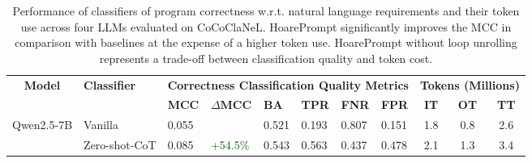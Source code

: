 \documentclass[sigconf]{acmart}
\newcommand{\projName}{HoarePrompt\xspace}
\newcommand{\benchName}{CoCoClaNeL\xspace}
\begin{document}
\begin{table}[t]
    \centering
    \caption{Performance of classifiers of program correctness w.r.t. natural language requirements and their token use across four LLMs evaluated on \benchName. \projName significantly improves the MCC in comparison with baselines at the expense of a higher token use. \projName without loop unrolling represents a trade-off between classification quality and token cost. }
    \label{tab:results}
   \begin{tabular}{|c|l|p{0.9cm}p{1.2cm}p{0.9cm}p{0.9cm}p{0.9cm}p{0.9cm}|ccc|}

        \hline
        \multirow{2}{*}{\textbf{Model}} & \multirow{2}{*}{\textbf{Classifier}} & \multicolumn{6}{c|}{\textbf{Correctness Classification Quality Metrics}} & \multicolumn{3}{c|}{\textbf{Tokens (Millions)}} \\
        \cline{3-11}
        & & \textbf{MCC} & $\Delta\mathbf{MCC}$ & \textbf{BA} & \textbf{TPR} & \textbf{FNR} & \textbf{FPR} & \textbf{IT} & \textbf{OT} & \textbf{TT} \\
        \hline
       \multirow{5}{*}{\parbox{1.8cm}{\centering Qwen2.5-7B}}
         & Vanilla       & 0.055 & \textcolor{red}{  } & 0.521 & 0.193 & 0.807 & 0.151 & 1.8 & 0.8 & 2.6 \\
        & Zero-shot-CoT  & 0.085 & \textcolor{darkgreen}{+54.5\%}  & 0.543 & 0.563 & 0.437 & 0.478 & 2.1 & 1.3 & 3.4 \\
       

\end{tabular}
\end{table}
\end{document}
